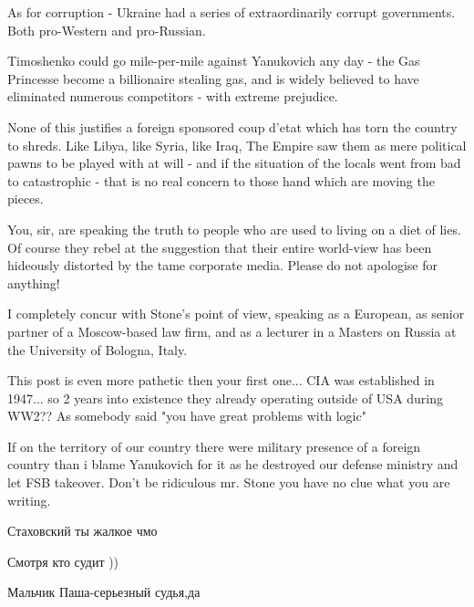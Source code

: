\begin{itemize}

As for corruption - Ukraine had a series of extraordinarily corrupt
governments. Both pro-Western and pro-Russian.

Timoshenko could go mile-per-mile against Yanukovich any day - the Gas
Princesse become a billionaire stealing gas, and is widely believed to have
eliminated numerous competitors - with extreme prejudice.

None of this justifies a foreign sponsored coup d'etat which has torn the
country to shreds. Like Libya, like Syria, like Iraq, The Empire saw them as
mere political pawns to be played with at will - and if the situation of the
locals went from bad to catastrophic - that is no real concern to those hand
which are moving the pieces.


You, sir, are speaking the truth to people who are used to living on a diet of
lies. Of course they rebel at the suggestion that their entire world-view has
been hideously distorted by the tame corporate media. Please do not apologise
for anything!

\begin{itemize} %

I completely concur with Stone's point of view, speaking as a European, as
senior partner of a Moscow-based law firm, and as a lecturer in a Masters on
Russia at the University of Bologna, Italy.

\end{itemize} %


This post is even more pathetic then your first one... CIA was established in
1947... so 2 years into existence they already operating outside of USA during
WW2?? As somebody said "you have great problems with logic"

If on the territory of our country there were military presence of a foreign
country than i blame Yanukovich for it as he destroyed our defense ministry and
let FSB takeover. Don't be ridiculous mr. Stone you have no clue what you are
writing.

\begin{itemize} %
Стаховский ты жалкое чмо


Смотря кто судит ))

Мальчик Паша-серьезный судья,да


\end{itemize}
\end{itemize}
